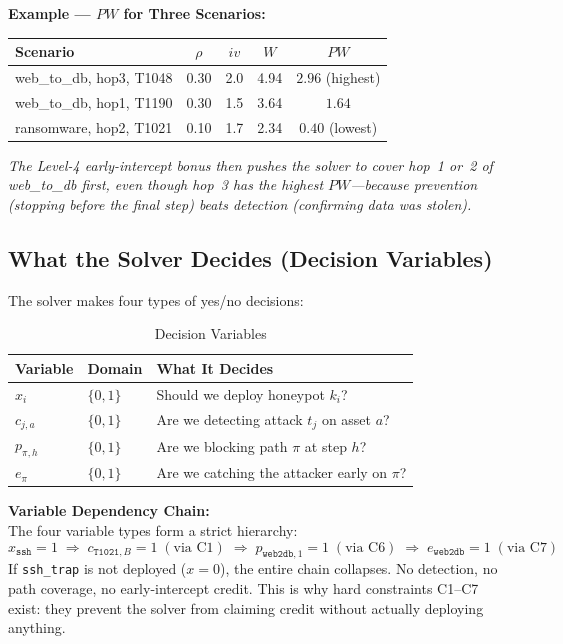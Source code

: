 \documentclass[journal]{IEEEtran}
\begin{document}
\begin{examplebox}
\textbf{Example --- $PW$ for Three Scenarios:}
\begin{center}
\small
\renewcommand{\arraystretch}{1.1}
\begin{tabular}{@{}lcccc@{}}
\toprule
\textbf{Scenario} & $\rho$ & $iv$ & $W$ & $PW$ \\
\midrule
web\_to\_db, hop3, T1048  & 0.30 & 2.0 & 4.94 &
  $\mathbf{2.96}$ (highest) \\
web\_to\_db, hop1, T1190  & 0.30 & 1.5 & 3.64 &
  $\mathbf{1.64}$ \\
ransomware, hop2, T1021   & 0.10 & 1.7 & 2.34 &
  $\mathbf{0.40}$ (lowest) \\
\bottomrule
\end{tabular}
\end{center}
\textit{The Level-4 early-intercept bonus then pushes the
solver to cover hop~1 or~2 of web\_to\_db first, even
though hop~3 has the highest $PW$---because prevention
(stopping before the final step) beats detection
(confirming data was stolen).}
\end{examplebox}

\subsection{What the Solver Decides (Decision Variables)}

The solver makes four types of yes/no decisions:

\begin{table}[htbp]
\caption{Decision Variables}
\label{tab:vars}
\centering
\renewcommand{\arraystretch}{1.2}
\begin{tabular}{@{}lll@{}}
\toprule
\textbf{Variable} & \textbf{Domain} & \textbf{What It Decides} \\
\midrule
$x_i$      & $\{0,1\}$ & Should we deploy honeypot $k_i$? \\
$c_{j,a}$  & $\{0,1\}$ & Are we detecting attack $t_j$ on asset $a$? \\
$p_{\pi,h}$& $\{0,1\}$ & Are we blocking path $\pi$ at step $h$? \\
$e_\pi$    & $\{0,1\}$ & Are we catching the attacker early on $\pi$? \\
\bottomrule
\end{tabular}
\end{table}

\begin{examplebox}
\textbf{Variable Dependency Chain:}\\[3pt]
The four variable types form a strict hierarchy:
$$x_{\texttt{ssh}}=1
\;\Rightarrow\; c_{\texttt{T1021},B}=1 \;(\text{via C1})
\;\Rightarrow\; p_{\texttt{web2db},1}=1 \;(\text{via C6})
\;\Rightarrow\; e_{\texttt{web2db}}=1 \;(\text{via C7})$$
If \texttt{ssh\_trap} is not deployed ($x=0$), the entire
chain collapses.
No detection, no path coverage, no early-intercept credit.
This is why hard constraints C1--C7 exist: they prevent the
solver from claiming credit without actually deploying
anything.
\end{examplebox}
\end{document}
